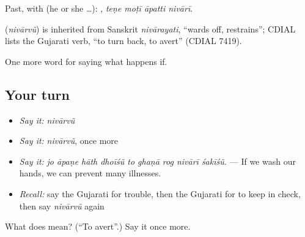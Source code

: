 Past, with  (he or she …):    , \emph{teṇe moṭī āpatti nivārī}.

\begin{cousinweb}
\textbf{} (\emph{nivārvũ}) is inherited from Sanskrit \emph{nivārayati}, \textquotedblleft{}wards off, restrains\textquotedblright{}; CDIAL lists the Gujarati verb, \textquotedblleft{}to turn back, to avert\textquotedblright{} (CDIAL 7419).
\end{cousinweb}

\begin{grammarlens}[title={What you've built}]
One more word for saying what happens if.
\end{grammarlens}

\subsection*{Your turn}
\begin{itemize}
\raggedright
  \item \emph{Say it:} \emph{nivārvũ}
  \item \emph{Say it:} \emph{nivārvũ}, once more
  \item \emph{Say it:} \emph{jo āpaṇe hāth dhoīśũ to ghaṇā rog nivārī śakīśũ.} — If we wash our hands, we can prevent many illnesses.
  \item \emph{Recall:} say the Gujarati for trouble, then the Gujarati for to keep in check, then say \emph{nivārvũ} again
\end{itemize}

\begin{tcolorbox}[breakable,colback=teal!4,colframe=teal!35!black,title={Before you move on}]
What does  mean? (\textquotedblleft{}To avert\textquotedblright{}.) Say it once more.
\end{tcolorbox}

